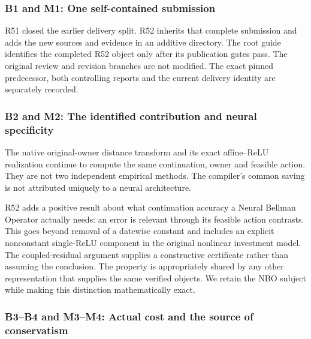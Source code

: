 \hypertarget{b1-and-m1-one-self-contained-submission}{%
\subsubsection{B1 and M1: One self-contained
submission}\label{b1-and-m1-one-self-contained-submission}}

R51 closed the earlier delivery split. R52 inherits that complete
submission and adds the new sources and evidence in an additive
directory. The root guide identifies the completed R52 object only after
its publication gates pass. The original review and revision branches
are not modified. The exact pinned predecessor, both controlling reports
and the current delivery identity are separately recorded.

\hypertarget{b2-and-m2-the-identified-contribution-and-neural-specificity}{%
\subsubsection{B2 and M2: The identified contribution and neural
specificity}\label{b2-and-m2-the-identified-contribution-and-neural-specificity}}

The native original-owner distance transform and its exact affine--ReLU
realization continue to compute the same continuation, owner and
feasible action. They are not two independent empirical methods. The
compiler's common saving is not attributed uniquely to a neural
architecture.

R52 adds a positive result about what continuation accuracy a Neural
Bellman Operator actually needs: an error is relevant through its
feasible action contrasts. This goes beyond removal of a datewise
constant and includes an explicit nonconstant single-ReLU component in
the original nonlinear investment model. The coupled-residual argument
supplies a constructive certificate rather than assuming the conclusion.
The property is appropriately shared by any other representation that
supplies the same verified objects. We retain the NBO subject while
making this distinction mathematically exact.

\hypertarget{b3b4-and-m3m4-actual-cost-and-the-source-of-conservatism}{%
\subsubsection{B3--B4 and M3--M4: Actual cost and the source of
conservatism}\label{b3b4-and-m3m4-actual-cost-and-the-source-of-conservatism}}

